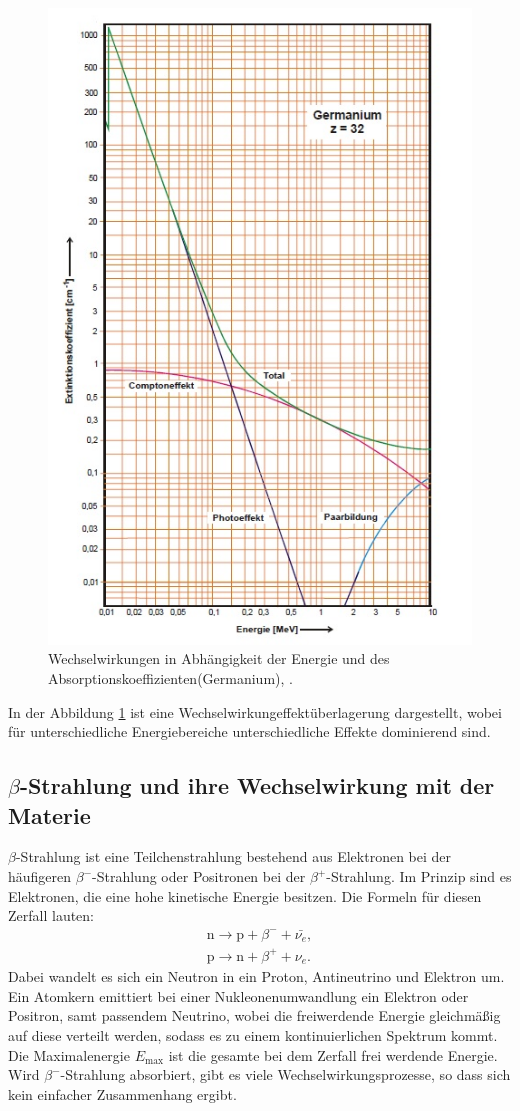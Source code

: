 \begin{figure}[h!]
	\centering
	\includegraphics[width=0.7\linewidth]{EnergieWechselwirkung.jpg}
	\caption{Wechselwirkungen in Abhängigkeit der Energie und des Absorptionskoeffizienten(Germanium), \cite[7]{anleitung704}.}
	\label{fig:energiewechselwirkung}
\end{figure}

In der Abbildung \ref{fig:energiewechselwirkung} ist eine Wechselwirkungeffektüberlagerung dargestellt, wobei für unterschiedliche Energiebereiche unterschiedliche Effekte dominierend sind. 

\subsection{\texorpdfstring{$\beta$}{beta}-Strahlung und ihre Wechselwirkung mit der Materie}

$\beta$-Strahlung ist eine Teilchenstrahlung bestehend aus Elektronen bei der häufigeren $\beta^{-}$-Strahlung oder Positronen bei der $\beta^{+}$-Strahlung. Im Prinzip sind es Elektronen, die eine hohe kinetische Energie besitzen.
Die Formeln für diesen Zerfall lauten:
\begin{align*}
\text{n} \rightarrow \text{p} + \beta^{-} + \bar{\nu_e}, \\
\text{p} \rightarrow \text{n} + \beta^{+} + \nu_e.
\end{align*}
Dabei wandelt es sich ein Neutron in ein Proton, Antineutrino und Elektron um. Ein Atomkern emittiert bei einer Nukleonenumwandlung ein Elektron oder Positron, samt passendem Neutrino, wobei die freiwerdende Energie gleichmäßig auf diese verteilt werden, 
sodass es zu einem kontinuierlichen Spektrum kommt. Die Maximalenergie $E_\text{max}$ ist die gesamte bei dem Zerfall frei werdende Energie. 
Wird $\beta^{-}$-Strahlung absorbiert, gibt es viele Wechselwirkungsprozesse, so dass sich kein einfacher Zusammenhang ergibt. 

